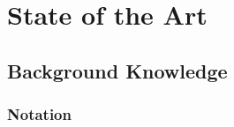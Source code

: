 \chapter{State of the Art}
\label{chap:state-of-the-art}
\label{chap:background}


\section{Background Knowledge}
\label{sec:background}


\subsection{Notation}
\label{sec:bg-notation}

